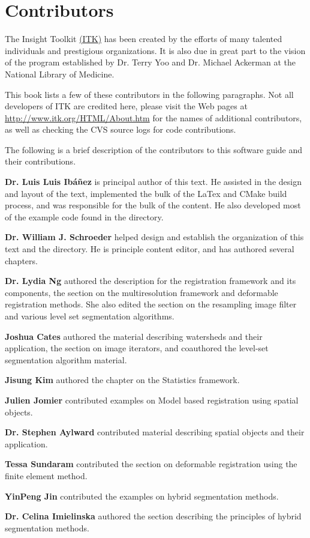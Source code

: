 \chapter*{Contributors}
\noindent

The Insight Toolkit \href{http://www.itk.org}{(ITK)} has been created by the
efforts of many talented individuals and prestigious organizations. It is also
due in great part to the vision of the program established by Dr. Terry Yoo
and Dr. Michael Ackerman at the National Library of Medicine.

This book lists a few of these contributors in the following paragraphs. Not
all developers of ITK are credited here, please visit the Web pages at
\href{http://www.itk.org/HTML/About.htm}{http://www.itk.org/HTML/About.htm} 
for the names of additional contributors, as well as checking the CVS source
logs for code contributions.

The following is a brief description of the contributors to this software
guide and their contributions.

{\bf Dr. Luis Luis Ib\'{a}\~{n}ez} is principal author of this text.
He assisted in the design and layout of the text, implemented the bulk of
the LaTex and CMake build process, and was responsible for the bulk of 
the content. He also developed most of the example code found in the
 directory.

{\bf Dr. William J. Schroeder} helped design and establish the organization 
of this text and the  directory. He is principle 
content editor, and has authored several chapters.

{\bf Dr. Lydia Ng} authored the description for the registration framework and
its components, the section on the multiresolution framework and deformable
registration methods. She also edited the section on the resampling image
filter and various level set segmentation algorithms.

{\bf Joshua Cates} authored the material describing watersheds and their
application, the section on image iterators, and coauthored the level-set 
segmentation algorithm material.

{\bf Jisung Kim} authored the chapter on the Statistics framework.

{\bf Julien Jomier} contributed examples on Model based registration using
spatial objects.

{\bf Dr. Stephen Aylward}  contributed material describing spatial objects and
their application.

{\bf Tessa Sundaram} contributed the section on deformable registration using
the finite element method.

{\bf YinPeng Jin} contributed the examples on  hybrid segmentation methods. 

{\bf Dr. Celina Imielinska} authored the section describing the principles of
hybrid segmentation methods.
